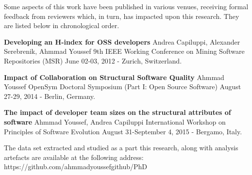
\begin{publications}

Some aspects of this work have been published in various venues, receiving formal feedback from reviewers which, in turn, has impacted upon this research. They are listed below in chronological order.

\textbf{Developing an H-index for OSS developers}\newline
Andrea Capiluppi, Alexander Serebrenik, Ahmmad Youssef 9th IEEE Working Conference on Mining Software Repositories (MSR)\newline
June 02-03, 2012 - Zurich, Switzerland. 

\textbf{Impact of Collaboration on Structural Software Quality}\newline
Ahmmad Youssef OpenSym Doctoral Symposium (Part I: Open Source Software)\newline
August 27-29, 2014 - Berlin, Germany. \nocite{youssef2012impact}

\textbf{The impact of developer team sizes on the structural attributes of software}\newline
Ahmmad Youssef, Andrea Capiluppi International Workshop on Principles of Software Evolution\newline
August 31-September 4, 2015 - Bergamo, Italy. \nocite{youssef2015impact}

The data set extracted and studied as a part this research, along with analysis artefacts are available at the following address: https://github.com/ahmmadyoussefgithub/PhD
\end{publications}

